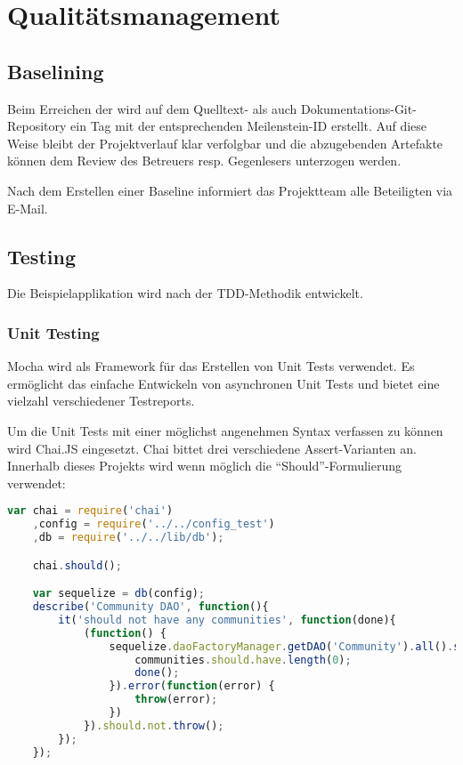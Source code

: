 \section{Qualitätsmanagement}
\label{sec:qualitymanagement}

\subsection{Baselining}
Beim Erreichen der  wird auf dem Quelltext- als auch Dokumentations-Git-Repository ein Tag mit der entsprechenden Meilenstein-ID erstellt. Auf diese Weise bleibt der Projektverlauf klar verfolgbar und die abzugebenden Artefakte können dem Review des Betreuers resp. Gegenlesers unterzogen werden.

Nach dem Erstellen einer Baseline informiert das Projektteam alle Beteiligten via E-Mail.

\subsection{Testing}
Die Beispielapplikation wird nach der \gls{TDD}-Methodik entwickelt.

\subsubsection*{Unit Testing}
Mocha \cite{Mocha} wird als Framework für das Erstellen von Unit Tests verwendet. Es ermöglicht das einfache Entwickeln von asynchronen Unit Tests und bietet eine vielzahl verschiedener Testreports.

Um die Unit Tests mit einer möglichst angenehmen Syntax verfassen zu können wird Chai.JS \cite{ChaiJS} eingesetzt. Chai bittet drei verschiedene Assert-Varianten an. Innerhalb dieses Projekts wird wenn möglich die ``Should''-Formulierung verwendet:

\begin{lstlisting}[language=JavaScript, caption=Beispiel eines Unit Tests mit Mocha und Chai.js]
var chai = require('chai')
	,config = require('../../config_test')
	,db = require('../../lib/db');

	chai.should();

	var sequelize = db(config);
	describe('Community DAO', function(){
		it('should not have any communities', function(done){
			(function() {
				sequelize.daoFactoryManager.getDAO('Community').all().success(function(communities) {
					communities.should.have.length(0);
					done();
				}).error(function(error) {
					throw(error);
				})
			}).should.not.throw();
		});
	});
\end{lstlisting}

